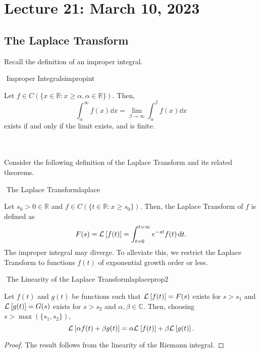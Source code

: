 \pagebreak

\section{Lecture 21: March 10, 2023}

    \subsection{The Laplace Transform}

        Recall the definition of an improper integral.
        \begin{definition}{\Stop\,\,Improper Integrals}{impropint}

            Let \(f\in C(\{x\in\mathbb{R}:x\geq \alpha, \alpha\in\mathbb{R}\})\). Then,
            \begin{equation*}
                \int_\alpha^\infty f(x)\dd x=\lim_{\beta\to \infty}\int_\alpha^\beta f(x)\dd x
            \end{equation*}
            exists if and only if the limit exists, and is finite.
            
        \end{definition}
        \vphantom
        \\
        \\
        Consider the following definition of the Laplace Transform and its related theorems.
        \begin{definition}{\Stop\,\,The Laplace Transform}{laplace}
        
            Let \(s_0>0\in\mathbb{R}\) and \(f\in C(\{t\in\mathbb{R}:x\geq s_0\})\). Then, the Laplace Transform of \(f\) is defined as
            \begin{equation*}
                F(s)=\mathcal{L}^{}\left[f(t)\right]=\int_{t=0}^{t=\infty} e^{-st}f(t)\,\text{d} t.
            \end{equation*}
            The improper integral may diverge. To alleviate this, we restrict the Laplace Transform to functions \(f(t)\) of exponential growth order or less.
        
        \end{definition}
        \begin{theorem}{\Stop\,\,The Linearity of the Laplace Transform}{laplaceprop2}
    
            Let \(f(t)\) and \(g(t)\) be functions such that \(\mathcal{L}^{}\left[f(t)\right]=F(s)\) exists for \(s>s_1\) and \(\mathcal{L}^{}\left[g(t)\right]=G(s)\) exists for \(s>s_2\) and \(\alpha,\beta\in\mathbb{C}\). Then, choosing \(s>\max(\{s_1,s_2\})\),
            \begin{equation*}
                \mathcal{L}^{}\left[\alpha f(t)+\beta g(t)\right]=\alpha\mathcal{L}^{}\left[f(t)\right]+\beta\mathcal{L}^{}\left[g(t)\right].
            \end{equation*}
            \begin{proof}
                The result follows from the linearity of the Riemann integral.
            \end{proof}
        
        \end{theorem}
